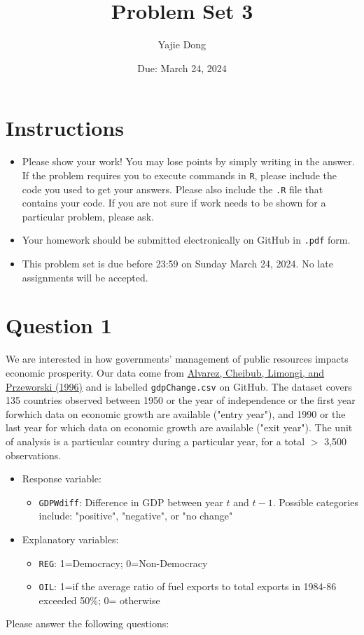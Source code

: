 \documentclass[12pt,letterpaper]{article}
\title{Problem Set 3}
\date{Due: March 24, 2024}
\author{Yajie Dong}
\begin{document}
	\maketitle
	\section*{Instructions}
	\begin{itemize}
	\item Please show your work! You may lose points by simply writing in the answer. If the problem requires you to execute commands in \texttt{R}, please include the code you used to get your answers. Please also include the \texttt{.R} file that contains your code. If you are not sure if work needs to be shown for a particular problem, please ask.
\item Your homework should be submitted electronically on GitHub in \texttt{.pdf} form.
\item This problem set is due before 23:59 on Sunday March 24, 2024. No late assignments will be accepted.
	\end{itemize}

	\vspace{.25cm}
\section*{Question 1}
\vspace{.25cm}
\noindent We are interested in how governments' management of public resources impacts economic prosperity. Our data come from \href{https://www.researchgate.net/profile/Adam_Przeworski/publication/240357392_Classifying_Political_Regimes/links/0deec532194849aefa000000/Classifying-Political-Regimes.pdf}{Alvarez, Cheibub, Limongi, and Przeworski (1996)} and is labelled \texttt{gdpChange.csv} on GitHub. The dataset covers 135 countries observed between 1950 or the year of independence or the first year forwhich data on economic growth are available ("entry year"), and 1990 or the last year for which data on economic growth are available ("exit year"). The unit of analysis is a particular country during a particular year, for a total $>$ 3,500 observations. 

\begin{itemize}
	\item
	Response variable: 
	\begin{itemize}
		\item \texttt{GDPWdiff}: Difference in GDP between year $t$ and $t-1$. Possible categories include: "positive", "negative", or "no change"
	\end{itemize}
	\item
	Explanatory variables: 
	\begin{itemize}
		\item
		\texttt{REG}: 1=Democracy; 0=Non-Democracy
		\item
		\texttt{OIL}: 1=if the average ratio of fuel exports to total exports in 1984-86 exceeded 50\%; 0= otherwise
	\end{itemize}
	
\end{itemize}
\newpage
\noindent Please answer the following questions:
\end{document}
